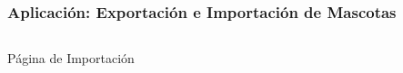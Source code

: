 \documentclass[14pt]{beamer}
\begin{document}
\begin{frame}
\frametitle{Aplicación: Exportación e Importación de Mascotas}
\begin{columns}
\begin{column}{0.3\textwidth}
\begin{center}

\begin{small}
\caption{Página de Importación}
\end{small}
\end{center}
\end{column}


\end{columns}
\end{frame}
\end{document}
